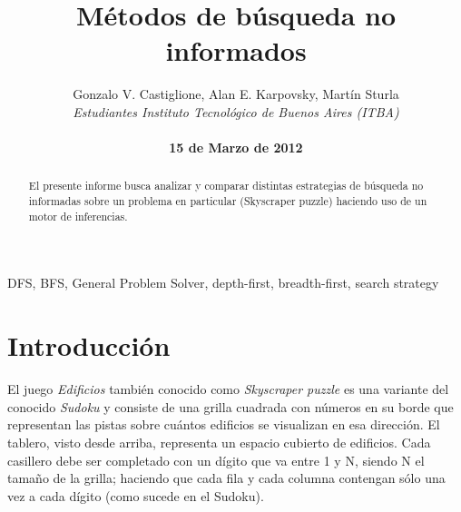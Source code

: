 \documentclass[%
    final,
    reprint,
    notitlepage,
    narroweqnarray,
    inline,
    twoside,
    invited
    ]{ieee}
\begin{document}
\title[Métodos de búsqueda no informados]{%
       Métodos de búsqueda no informados}

\author[Castiglione, Karpovsky, Sturla]{Gonzalo V. Castiglione, Alan E. Karpovsky, Martín Sturla\\\textit{Estudiantes 
       Instituto Tecnológico de Buenos Aires (ITBA)}\\
\\\textbf{15 de Marzo de 2012}
}



\lognumber{}
\pubitemident{}


\maketitle               

\begin{abstract} 
El presente informe busca analizar y comparar distintas estrategias de búsqueda no informadas sobre un problema en particular (Skyscraper puzzle) haciendo uso de un motor de inferencias.
\end{abstract}

\begin{keywords}
DFS, BFS, General Problem Solver, depth-first, breadth-first, search strategy
\end{keywords}

\section{Introducción}

\PARstart El juego \textit{Edificios} también conocido como \textit{Skyscraper puzzle} es una variante del conocido \textit{Sudoku} y consiste de una grilla cuadrada con números en su borde que representan las pistas sobre cuántos edificios se visualizan en esa dirección. El tablero, visto desde arriba, representa un espacio cubierto de edificios. Cada casillero debe ser completado con un dígito que va entre 1 y N, siendo N el tamaño de la grilla; haciendo que cada fila y cada columna contengan sólo una vez a cada dígito (como sucede en el Sudoku).
\end{document}
